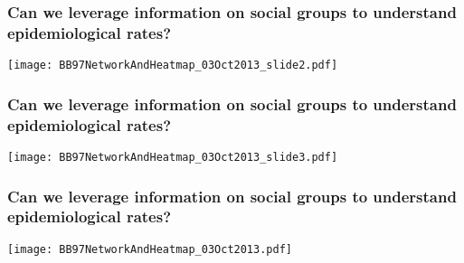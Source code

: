 \documentclass[fleqn,xcolor=table]{beamer}
\begin{document}
\begin{frame}
\frametitle{\color{darkred} Can we leverage information on social groups to
understand epidemiological rates?}
\vspace{.1in}

\begin{center}
\texttt{[image: BB97NetworkAndHeatmap\_03Oct2013\_slide2.pdf]}
\end{center}

\end{frame}


\begin{frame}
\frametitle{\color{darkred} Can we leverage information on social groups to
understand epidemiological rates?}
\vspace{.1in}

\begin{center}
\texttt{[image: BB97NetworkAndHeatmap\_03Oct2013\_slide3.pdf]}
\end{center}

\end{frame}

\begin{frame}
\frametitle{\color{darkred} Can we leverage information on social groups to
understand epidemiological rates?}
\vspace{.1in}

\begin{center}
\texttt{[image: BB97NetworkAndHeatmap\_03Oct2013.pdf]}
\end{center}

\end{frame}
%
%
\end{document}
